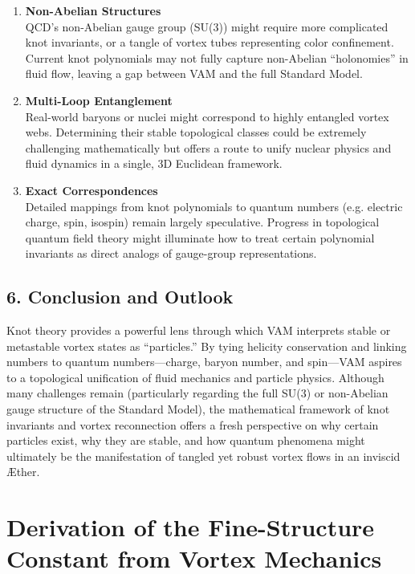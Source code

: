 \documentclass[aps,preprint,superscriptaddress]{revtex4-2}
\begin{document}
    \begin{enumerate}
        \item \textbf{Non-Abelian Structures} \\
    QCD’s non-Abelian gauge group (SU(3)) might require more complicated knot invariants, or a tangle of vortex tubes representing color confinement. Current knot polynomials may not fully capture non-Abelian “holonomies” in fluid flow, leaving a gap between VAM and the full Standard Model.
        \item \textbf{Multi-Loop Entanglement} \\
    Real-world baryons or nuclei might correspond to highly entangled vortex webs. Determining their stable topological classes could be extremely challenging mathematically but offers a route to unify nuclear physics and fluid dynamics in a single, 3D Euclidean framework.
        \item \textbf{Exact Correspondences} \\
    Detailed mappings from knot polynomials to quantum numbers (e.g. electric charge, spin, isospin) remain largely speculative. Progress in topological quantum field theory might illuminate how to treat certain polynomial invariants as direct analogs of gauge-group representations.
    \end{enumerate}

    \subsection*{6. Conclusion and Outlook}

    Knot theory provides a powerful lens through which VAM interprets stable or metastable vortex states as “particles.” By tying helicity conservation and linking numbers to quantum numbers—charge, baryon number, and spin—VAM aspires to a topological unification of fluid mechanics and particle physics. Although many challenges remain (particularly regarding the full SU(3) or non-Abelian gauge structure of the Standard Model), the mathematical framework of knot invariants and vortex reconnection offers a fresh perspective on why certain particles exist, why they are stable, and how quantum phenomena might ultimately be the manifestation of tangled yet robust vortex flows in an inviscid Æther.


    \section{Derivation of the Fine-Structure Constant from Vortex Mechanics}
    \label{sec:appendix-alpha}
\end{document}
